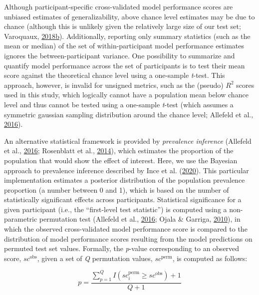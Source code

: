 \documentclass[11pt,american,]{memoir} %
\begin{document}
Although participant-specific cross-validated model performance scores are unbiased estimates of generalizability, above chance level estimates may be due to chance (although this is unlikely given the relatively large size of our test set; Varoquaux, \protect\hyperlink{ref-Varoquaux2018-uo}{2018}\protect\hyperlink{ref-Varoquaux2018-uo}{b}). Additionally, reporting only summary statistics (such as the mean or median) of the set of within-participant model performance estimates ignores the between-participant variance. One possibility to summarize and quantify model performance across the set of participants is to test their mean score against the theoretical chance level using a one-sample \emph{t}-test. This approach, however, is invalid for unsigned metrics, such as the (pseudo) \(R^{2}\) scores used in this study, which logically cannot have a population mean below chance level and thus cannot be tested using a one-sample \emph{t}-test (which assumes a symmetric gaussian sampling distribution around the chance level; Allefeld et al., \protect\hyperlink{ref-Allefeld2016-xp}{2016}).

An alternative statistical framework is provided by \emph{prevalence inference} (Allefeld et al., \protect\hyperlink{ref-Allefeld2016-xp}{2016}; Rosenblatt et al., \protect\hyperlink{ref-Rosenblatt2014-az}{2014}), which estimates the proportion of the population that would show the effect of interest. Here, we use the Bayesian approach to prevalence inference described by Ince et al. (\protect\hyperlink{ref-Ince2020-mr}{2020}). This particular implementation estimates a posterior distribution of the population prevalence proportion (a number between 0 and 1), which is based on the number of statistically significant effects across participants. Statistical significance for a given participant (i.e., the ``first-level test statistic'') is computed using a non-parametric permutation test (Allefeld et al., \protect\hyperlink{ref-Allefeld2016-xp}{2016}; Ojala \& Garriga, \protect\hyperlink{ref-Ojala2010-rc}{2010}), in which the observed cross-validated model performance score is compared to the distribution of model performance scores resulting from the model predictions on permuted test set values. Formally, the \emph{p}-value corresponding to an observed score, \(sc^{\mathrm{obs}}\), given a set of \emph{Q} permutation values, \(sc^{\mathrm{perm}}\), is computed as follows:

\begin{equation}
p = \frac{\sum_{p=1}^{Q} I(sc_{i}^{\mathrm{perm}} \geq sc^{\mathrm{obs}}) + 1}{Q + 1}
\end{equation}
\end{document}
